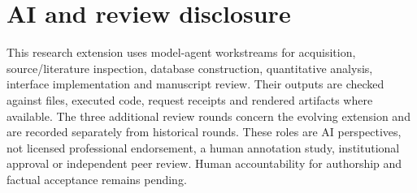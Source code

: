 \section*{AI and review disclosure}
This research extension uses model-agent workstreams for acquisition, source/literature inspection, database construction, quantitative analysis, interface implementation and manuscript review. Their outputs are checked against files, executed code, request receipts and rendered artifacts where available. The three additional review rounds concern the evolving extension and are recorded separately from historical rounds. These roles are AI perspectives, not licensed professional endorsement, a human annotation study, institutional approval or independent peer review. Human accountability for authorship and factual acceptance remains pending.
